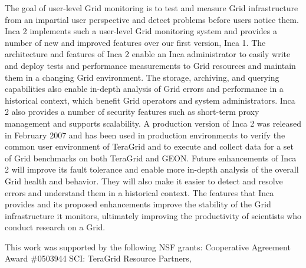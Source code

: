 \documentclass[times,10pt,twocolumn]{article}
\begin{document}
The goal of user-level Grid monitoring is to test and measure Grid
infrastructure from an impartial user perspective and detect problems before
users notice them.  Inca 2 implements such a user-level Grid monitoring system
and provides a number of new and improved features over our first version,
Inca 1.  The architecture and features of Inca 2 enable an Inca administrator
to easily write and deploy tests and performance measurements to Grid
resources and maintain them in a changing Grid environment.  The storage,
archiving, and querying capabilities also enable in-depth analysis of Grid
errors and performance in a historical context, which benefit Grid
operators and system administrators.  Inca 2 also provides a number of
security features such as short-term proxy management and supports
scalability.  A production version of Inca 2 was released in February 2007 and
has been used in production environments to verify the common user environment
of TeraGrid and to execute and collect data for a set of Grid benchmarks on
both TeraGrid and GEON.  Future enhancements of Inca 2 will improve its fault
tolerance and enable more in-depth analysis of the overall Grid health and
behavior.  They will also make it easier to detect and resolve errors
and understand them in a historical context.  The features that Inca
provides and its proposed enhancements improve the stability of the
Grid infrastructure it monitors, ultimately improving the productivity of
scientists who conduct research on a Grid. 


This work was supported by the following NSF grants:  Cooperative Agreement
Award \#0503944 SCI: TeraGrid Resource Partners,



\end{document}
